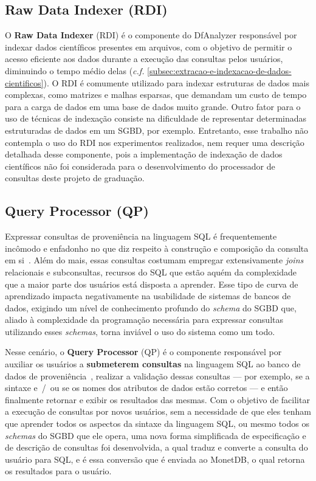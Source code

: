 \subsection{Raw Data Indexer (RDI)}

O \textbf{Raw Data Indexer} (RDI) é o componente do DfAnalyzer responsável por indexar dados científicos presentes em arquivos, com o objetivo de permitir o acesso eficiente aos dados durante a execução das consultas pelos usuários, diminuindo o tempo médio delas (\textit{c.f.} \autoref{subsec:extracao-e-indexacao-de-dados-cientificos}). O RDI é comumente utilizado para indexar estruturas de dados mais complexas, como matrizes e malhas esparsas, que demandam um custo de tempo para a carga de dados em uma base de dados muito grande. Outro fator para o uso de técnicas de indexação consiste na dificuldade de representar determinadas estruturadas de dados em um SGBD, por exemplo. Entretanto, esse trabalho não contempla o uso do RDI nos experimentos realizados, nem requer uma descrição detalhada desse componente, pois a implementação de indexação de dados científicos não foi considerada para o desenvolvimento do processador de consultas deste projeto de graduação.

\subsection{Query Processor (QP)}

Expressar consultas de proveniência na linguagem SQL é frequentemente incômodo e enfadonho no que diz respeito à construção e composição da consulta em si~\cite{gadelha2012mtcprov}. Além do mais, essas consultas costumam empregar extensivamente \textit{joins} relacionais e subconsultas, recursos do SQL que estão aquém da complexidade que a maior parte dos usuários está disposta a aprender. Esse tipo de curva de aprendizado impacta negativamente na usabilidade de sistemas de bancos de dados, exigindo um nível de conhecimento profundo do \textit{schema} do SGBD que, aliado à complexidade da programação necessária para expressar consultas utilizando esses \textit{schemas}, torna inviável o uso do sistema como um todo.

Nesse cenário, o \textbf{Query Processor} (QP) é o componente responsável por auxiliar os usuários a \textbf{submeterem consultas} na linguagem SQL ao banco de dados de proveniência~\cite{silva2016situ}, realizar a validação dessas consultas --- por exemplo, se a sintaxe e~/~ou se os nomes dos atributos de dados estão corretos --- e então finalmente retornar e exibir os resultados das mesmas. Com o objetivo de facilitar a execução de consultas por novos usuários, sem a necessidade de que eles tenham que aprender todos os aspectos da sintaxe da linguagem SQL, ou mesmo todos os \textit{schemas} do SGBD que ele opera, uma nova forma simplificada de especificação e de descrição de consultas foi desenvolvida, a qual traduz e converte a consulta do usuário para SQL, e é essa conversão que é enviada ao MonetDB, o qual retorna os resultados para o usuário.

